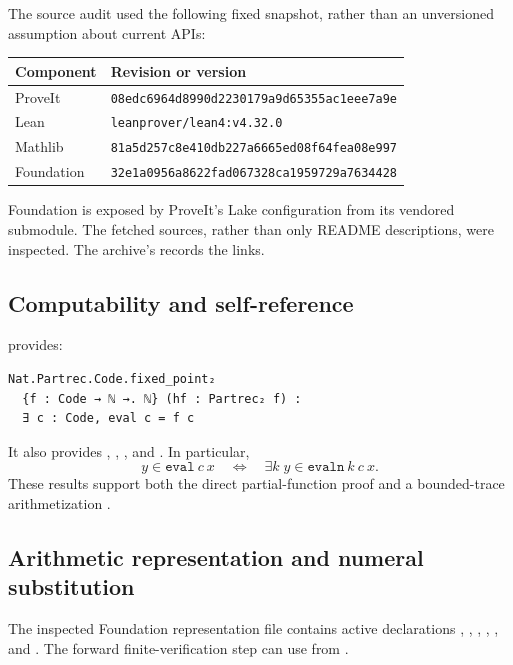 \documentclass[11pt]{article}
\theoremstyle{definition}
\theoremstyle{remark}
\begin{document}
The source audit used the following fixed snapshot, rather than an
unversioned assumption about current APIs:
\begin{center}
\begin{tabular}{@{}ll@{}}
\toprule
Component & Revision or version\\
\midrule
ProveIt & \texttt{08edc6964d8990d2230179a9d65355ac1eee7a9e}\\
Lean & \texttt{leanprover/lean4:v4.32.0}\\
Mathlib & \texttt{81a5d257c8e410db227a6665ed08f64fea08e997}\\
Foundation & \texttt{32e1a0956a8622fad067328ca1959729a7634428}\\
\bottomrule
\end{tabular}
\end{center}
Foundation is exposed by ProveIt's Lake configuration from its vendored
submodule. The fetched sources, rather than only README descriptions,
were inspected. The archive's  records the links.

\subsection{Computability and self-reference}

 provides:
\begin{lstlisting}
Nat.Partrec.Code.fixed_point₂
  {f : Code → ℕ →. ℕ} (hf : Partrec₂ f) :
  ∃ c : Code, eval c = f c
\end{lstlisting}
It also provides , ,
, and . In particular,
\[
 y\in\texttt{eval}\ c\ x
 \quad\Longleftrightarrow\quad
 \exists k\; y\in\texttt{evaln}\ k\ c\ x.
\]
These results support both the direct partial-function proof and a
bounded-trace arithmetization \cite{Mathlib}.

\subsection{Arithmetic representation and numeral substitution}

The inspected Foundation representation file contains active declarations
, , ,
, , and
. The forward finite-verification step can use
 from
.
\end{document}
